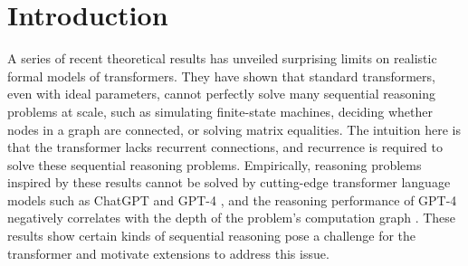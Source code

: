 \documentclass{article} %
\begin{document}
\begin{abstract}

\end{abstract}

\section{Introduction}

A series of recent theoretical results \citep{merrill2023parallelism,merrill2023logic,merrill2022SatAttnTC0,liu2023transformers,chiang2023tighter,hao2022ac0} has unveiled surprising limits on realistic formal models of transformers. They have shown that standard transformers, even with ideal parameters, cannot perfectly solve many sequential reasoning problems at scale, such as simulating finite-state machines, deciding whether nodes in a graph are connected, or solving matrix equalities. The intuition here is that the
transformer
lacks recurrent connections, and recurrence is required to solve these sequential reasoning problems. Empirically, reasoning problems inspired by these results cannot be solved by cutting-edge transformer language models such as ChatGPT and GPT-4 \citep{zhang2023language}, and the reasoning performance of GPT-4 negatively correlates with the depth of the problem's computation graph \citep{dziri2023faith}.
These results show certain kinds of sequential reasoning pose a challenge for the transformer and motivate extensions to address this issue.
\end{document}
